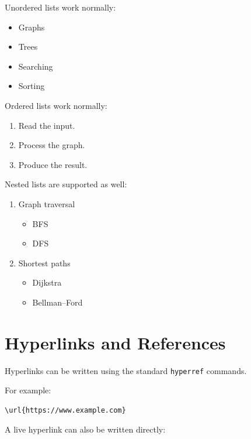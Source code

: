 \documentclass{csdept}
\begin{document}
Unordered lists work normally:

\begin{itemize}
    \item Graphs
    \item Trees
    \item Searching
    \item Sorting
\end{itemize}

Ordered lists work normally:

\begin{enumerate}
    \item Read the input.
    \item Process the graph.
    \item Produce the result.
\end{enumerate}

Nested lists are supported as well:

\begin{enumerate}
    \item Graph traversal

    \begin{itemize}
        \item BFS
        \item DFS
    \end{itemize}

    \item Shortest paths

    \begin{itemize}
        \item Dijkstra
        \item Bellman--Ford
    \end{itemize}
\end{enumerate}

\section{Hyperlinks and References}

Hyperlinks can be written using the standard \texttt{hyperref}
commands.

For example:

\begin{verbatim}
\url{https://www.example.com}
\end{verbatim}

A live hyperlink can also be written directly:
\end{document}
